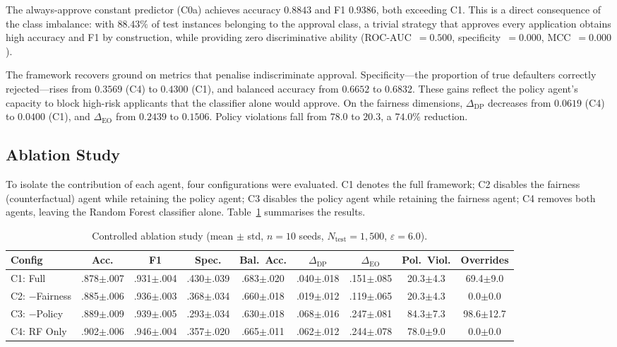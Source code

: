 The always-approve constant predictor (C0a) achieves accuracy $0.8843$ and
F1 $0.9386$, both exceeding C1. This is a direct consequence of the class
imbalance: with $88.43\%$ of test instances belonging to the approval class,
a trivial strategy that approves every application obtains high accuracy and
F1 by construction, while providing zero discriminative ability
(ROC-AUC~$= 0.500$, specificity~$= 0.000$, MCC~$= 0.000$).

The framework recovers ground on metrics that penalise indiscriminate
approval. Specificity---the proportion of true defaulters correctly
rejected---rises from $0.3569$ (C4) to $0.4300$ (C1), and balanced accuracy
from $0.6652$ to $0.6832$. These gains reflect the policy agent's capacity
to block high-risk applicants that the classifier alone would approve.
On the fairness dimensions, $\Delta_{\text{DP}}$ decreases from $0.0619$
(C4) to $0.0400$ (C1), and $\Delta_{\text{EO}}$ from $0.2439$ to $0.1506$.
Policy violations fall from $78.0$ to $20.3$, a $74.0\%$ reduction.

\subsection{Ablation Study}

To isolate the contribution of each agent, four configurations were
evaluated. C1 denotes the full framework; C2 disables the fairness
(counterfactual) agent while retaining the policy agent; C3 disables the
policy agent while retaining the fairness agent; C4 removes both agents,
leaving the Random Forest classifier alone. Table~\ref{tab:ablation}
summarises the results.

\begin{table}[htbp]
\centering
\caption{Controlled ablation study (mean $\pm$ std, $n{=}10$ seeds,
$N_{\text{test}}{=}1{,}500$, $\varepsilon{=}6.0$).}
\label{tab:ablation}
\setlength{\tabcolsep}{2.5pt}
\footnotesize
\begin{tabular}{lcccccccc}
\hline
\textbf{Config} & \textbf{Acc.} & \textbf{F1} & \textbf{Spec.} & \textbf{Bal.\ Acc.} & \textbf{$\Delta_{\text{DP}}$} & \textbf{$\Delta_{\text{EO}}$} & \textbf{Pol.\ Viol.} & \textbf{Overrides} \\
\hline
C1: Full        & .878$\pm$.007 & .931$\pm$.004 & .430$\pm$.039 & .683$\pm$.020 & .040$\pm$.018 & .151$\pm$.085 & 20.3$\pm$4.3 & 69.4$\pm$9.0 \\
C2: $-$Fairness & .885$\pm$.006 & .936$\pm$.003 & .368$\pm$.034 & .660$\pm$.018 & .019$\pm$.012 & .119$\pm$.065 & 20.3$\pm$4.3 & 0.0$\pm$0.0 \\
C3: $-$Policy   & .889$\pm$.009 & .939$\pm$.005 & .293$\pm$.034 & .630$\pm$.018 & .068$\pm$.016 & .247$\pm$.081 & 84.3$\pm$7.3 & 98.6$\pm$12.7 \\
C4: RF Only     & .902$\pm$.006 & .946$\pm$.004 & .357$\pm$.020 & .665$\pm$.011 & .062$\pm$.012 & .244$\pm$.078 & 78.0$\pm$9.0 & 0.0$\pm$0.0 \\
\hline
\end{tabular}
\end{table}

